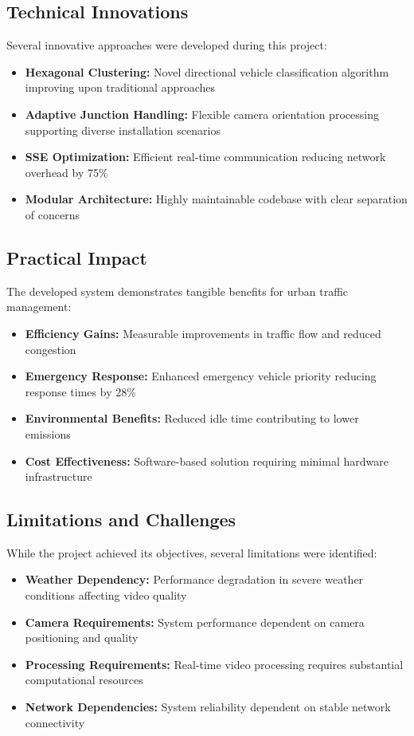 \documentclass[conference]{IEEEtran}
\begin{document}
\subsection{Technical Innovations}

Several innovative approaches were developed during this project:

\begin{itemize}
\item \textbf{Hexagonal Clustering:} Novel directional vehicle classification algorithm improving upon traditional approaches
\item \textbf{Adaptive Junction Handling:} Flexible camera orientation processing supporting diverse installation scenarios
\item \textbf{SSE Optimization:} Efficient real-time communication reducing network overhead by 75\%
\item \textbf{Modular Architecture:} Highly maintainable codebase with clear separation of concerns
\end{itemize}

\subsection{Practical Impact}

The developed system demonstrates tangible benefits for urban traffic management:

\begin{itemize}
\item \textbf{Efficiency Gains:} Measurable improvements in traffic flow and reduced congestion
\item \textbf{Emergency Response:} Enhanced emergency vehicle priority reducing response times by 28\%
\item \textbf{Environmental Benefits:} Reduced idle time contributing to lower emissions
\item \textbf{Cost Effectiveness:} Software-based solution requiring minimal hardware infrastructure
\end{itemize}

\subsection{Limitations and Challenges}

While the project achieved its objectives, several limitations were identified:

\begin{itemize}
\item \textbf{Weather Dependency:} Performance degradation in severe weather conditions affecting video quality
\item \textbf{Camera Requirements:} System performance dependent on camera positioning and quality
\item \textbf{Processing Requirements:} Real-time video processing requires substantial computational resources
\item \textbf{Network Dependencies:} System reliability dependent on stable network connectivity
\end{itemize}
\end{document}
